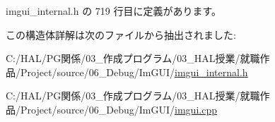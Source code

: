  imgui\+\_\+internal.\+h の 719 行目に定義があります。



この構造体詳解は次のファイルから抽出されました\+:\begin{DoxyCompactItemize}
\item 
C\+:/\+H\+A\+L/\+P\+G関係/03\+\_\+作成プログラム/03\+\_\+\+H\+A\+L授業/就職作品/\+Project/source/06\+\_\+\+Debug/\+Im\+G\+U\+I/\mbox{\hyperlink{imgui__internal_8h}{imgui\+\_\+internal.\+h}}\item 
C\+:/\+H\+A\+L/\+P\+G関係/03\+\_\+作成プログラム/03\+\_\+\+H\+A\+L授業/就職作品/\+Project/source/06\+\_\+\+Debug/\+Im\+G\+U\+I/\mbox{\hyperlink{imgui_8cpp}{imgui.\+cpp}}\end{DoxyCompactItemize}
